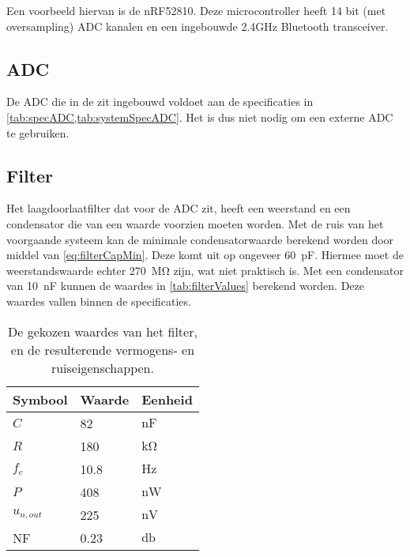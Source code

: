Een voorbeeld hiervan is de nRF52810. Deze microcontroller heeft 14 bit (met oversampling) ADC kanalen en een ingebouwde 2.4GHz Bluetooth transceiver. 


\subsection{ADC}
De ADC die in de \mcu  zit ingebouwd voldoet aan de specificaties in \cref{tab:specADC,tab:systemSpecADC}\cite{nrf52810}. Het is dus niet nodig om een externe ADC te gebruiken. 


\subsection{Filter}
Het laagdoorlaatfilter dat voor de ADC zit, heeft een weerstand en een condensator die van een waarde voorzien moeten worden.
Met de ruis van het voorgaande systeem kan de minimale condensatorwaarde berekend worden door middel van \cref{eq:filterCapMin}. Deze komt uit op ongeveer \qty{60}{\pico\farad}. Hiermee moet de weerstandswaarde echter \qty{270}{\mega\ohm} zijn, wat niet praktisch is. Met een condensator van \qty{10}{\nano\farad} kunnen de waardes in \autoref{tab:filterValues} berekend worden. Deze waardes vallen binnen de specificaties.

\begin{table}[ht]
    \centering
    \begin{tabular}{l|l|l}
        Symbool & Waarde & Eenheid \\
        \hline
        $C$         & 82    & $\si{\nano\farad}$\\
        $R$         & 180   & $\si{\kilo\ohm}$  \\
        $f_c$       & 10.8  & $\si{\hertz}$     \\
        $P$         & 408   & $\si{\nano\watt}$ \\
        $u_{n,out}$ & 225   & $\si{\nano\volt}$ \\
        NF          & 0.23  & $\si{\decibel}$   \\
    \end{tabular}
    \caption{De gekozen waardes van het filter, en de resulterende vermogens- en ruiseigenschappen.}
    \label{tab:filterValues}
\end{table}


